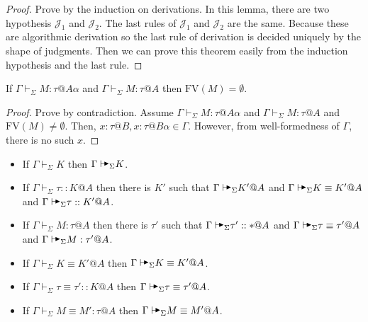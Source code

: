 \documentclass[9pt, a4paper]{extarticle}
\theoremstyle{break}
\newcommand{\G}{\Gamma}
\newcommand{\V}{\vdash_\Sigma}
\newcommand{\TB}{{\mathop{\blacktriangleright}}}
\newcommand{\E}{\equiv}
\newcommand{\FV}{\text{FV}}
\newcommand{\AV}{\vdash\!\!\!\raisebox{0.4ex}{\scalebox{0.7}{$\TB$}}}
\newcommand{\AVS}{\AV_\Sigma\xspace}
\begin{document}
\begin{proof}
    Prove by the induction on derivations.  In this lemma, there are two
    hypothesis \( \mathcal{J}_1 \) and \( \mathcal{J}_2 \).  The last rules of
    \( \mathcal{J}_1 \) and \( \mathcal{J}_2 \) are the same.  Because these
    are algorithmic derivation so the last rule of derivation is decided
    uniquely by the shape of judgments.  Then we can prove this theorem easily
    from the induction hypothesis and the last rule.
\end{proof}

\begin{lemma}
    \label{lemma:FreeVariableandStage}
    If \( \G\V M:\tau@{A\alpha} \) and \( \G\V M:\tau @A \) then \( \FV(M) = \emptyset \).
\end{lemma}

\begin{proof}
    Prove by contradiction. Assume \( \G\V M:\tau@{A\alpha} \) and \( \G\V
    M:\tau @A \) and \( \FV(M) \neq \emptyset \). Then, \( x : \tau @ B, x:
    \tau @ B\alpha \in \G \). However, from well-formedness of \( \G \), there
    is no such \( x \).
\end{proof}

\begin{theorem}
    \label{theorem:CompletenessofAlgorithmicTyping}
    \begin{itemize}
        \item If \(\G\V K \) then \(\G\AVS K \).
        \item If \(\G\V \tau ::K @ A \) then there is \(K'\) such that \( \G \AVS K' @ A \) and \( \G \AVS K\E K' @ A \) and \( \G\AVS \tau :: K' @ A \).
        \item If \(\G\V M:\tau @ A \) then there is \(\tau'\) such that \( \G \AVS \tau' :: * @ A \) and \( \G \AVS \tau \E \tau' @ A \) and \( \G\AVS M:\tau' @ A \).
        \item If \(\G\V K\E K' @ A \) then \(\G\AVS K\E K' @ A \).
        \item If \(\G\V \tau \E \tau' :: K @ A \) then \(\G\AVS \tau \E \tau' @ A \).
        \item If \(\G\V M\E M' : \tau @ A \) then \(\G \AVS M \E M' @ A \).
    \end{itemize}
\end{theorem}
\end{document}
